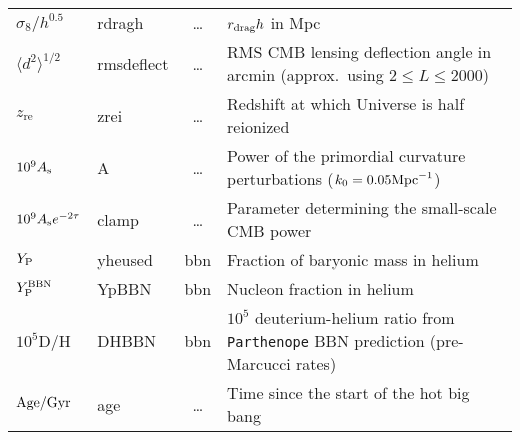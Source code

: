 \begin{tabular} {| l | l | c | l |}
$\sigma_8/h^{0.5}                  $ &  rdragh    &\dots &$r_{\rm drag} h$ in Mpc\\
$\langle d^2\rangle^{1/2}$ & rmsdeflect &\dots & RMS CMB lensing deflection angle in arcmin (approx.\ using $2\le L \le 2000$)\\
$z_{\mathrm{re}}       $ &  zrei        &\dots &Redshift at which Universe is half reionized\\
$10^9 A_{\rm s}        $ &  A           &\dots & Power of the primordial curvature perturbations ($k_0 = 0.05{\rm Mpc}^{-1}$)\\
$10^9 A_{\rm s} e^{-2\tau} $ &  clamp   &\dots & Parameter determining the small-scale CMB power\\
$Y_{\rm P}             $ &  yheused     & bbn &Fraction of baryonic mass in helium\\
$Y_{\rm P}^{\rm BBN}   $ &  YpBBN       & bbn & Nucleon fraction in helium\\
$10^5$D/H                &  DHBBN       & bbn & $10^5$ deuterium-helium ratio from {\tt Parthenope} BBN prediction (pre-Marcucci rates)\\
$\rm{Age}/{\rm Gyr}    $ &  age         &\dots & Time since the start of the hot big bang\\
\hline
\end{tabular}

